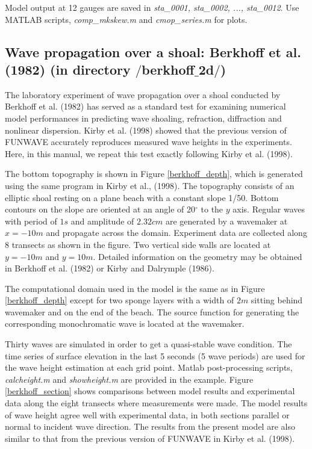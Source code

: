 \documentclass[11pt]{article}
\begin{document}
Model output at 12 gauges are saved in {\em sta\_0001, sta\_0002, ..., sta\_0012}. Use MATLAB scripts, {\em comp\_mkskew.m} and {\em cmop\_series.m} for plots. 

\subsection{Wave propagation over a shoal: Berkhoff et al. (1982)  (in directory $/$berkhoff$\_$2d$/$)}

The laboratory experiment of wave propagation over a shoal conducted by Berkhoff et al. (1982) has served as a standard test for examining numerical model performances in predicting wave shoaling, refraction, diffraction and nonlinear dispersion. Kirby et al. (1998) showed that the previous version of FUNWAVE accurately reproduces measured wave heights in the experiments. Here, in this manual, we repeat this test exactly following Kirby et al. (1998).

The bottom topography is shown in Figure \ref{berkhoff_depth}, which  is generated using the same program in Kirby et al., (1998). The topography consists of an elliptic shoal resting on a plane beach with a constant slope 1/50. Bottom contours on the slope are oriented at an angle of 20$^\circ$ to the $y$ axis. Regular waves with period of  $1 s$ and amplitude of $2.32 cm$ are generated by a wavemaker at $x=-10m$ and propagate across the domain. Experiment data are collected along 8 transects as shown in the figure. Two vertical side walls are located at $y = -10 m$ and $y=10 m$. Detailed information on the geometry may be obtained in Berkhoff et al. (1982) or Kirby and Dalrymple (1986). 

The computational domain used in the model is the same as in Figure \ref{berkhoff_depth} except for two sponge layers with a width of $2 m$  sitting behind wavemaker and on the end of the beach. The source function for generating the corresponding monochromatic wave is located at the wavemaker. 

Thirty waves are simulated in order to  get a quasi-stable wave condition. The time series of surface elevation in the last 5 seconds (5 wave periods) are used for the wave height estimation at each grid point. Matlab post-processing scripts, {\em calcheight.m}  and {\em showheight.m} are provided in the example.  Figure \ref{berkhoff_section} shows comparisons between model results and experimental data along the eight transects where measurements were made. The model results of wave height agree well with experimental data, in both sections parallel or normal to incident wave direction. The results from the present model are also similar to that from the previous version of FUNWAVE in Kirby et al. (1998).
\end{document}
